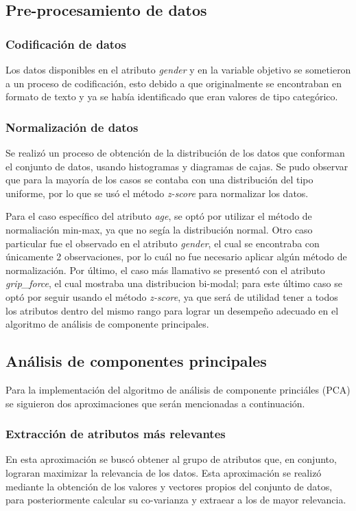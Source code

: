 \subsection{Pre-procesamiento de datos}
\subsubsection{Codificación de datos}
Los datos disponibles en el atributo \emph{gender} y en la variable objetivo se sometieron a un proceso de codificación, esto debido a que originalmente se encontraban en formato de texto y ya se había identificado que eran valores de tipo categórico.

\subsubsection{Normalización de datos}
Se realizó un proceso de obtención de la distribución de los datos que conforman el conjunto de datos, usando histogramas y diagramas de cajas. Se pudo observar que para la mayoría de los casos se contaba con una distribución del tipo uniforme, por lo que se usó el método \emph{z-score} para normalizar los datos.

Para el caso específico del atributo \emph{age}, se optó por utilizar el método de normaliación min-max, ya que no segía la distribución normal. Otro caso particular fue el observado en el atributo \emph{gender}, el cual se encontraba con únicamente 2 observaciones, por lo cuál no fue necesario aplicar algún método de normalización. Por último, el caso más llamativo se presentó con el atributo \emph{grip\_force}, el cual mostraba una distribucion bi-modal; para este último caso se optó por seguir usando el método \emph{z-score}, ya que será de utilidad tener a todos los atributos dentro del mismo rango para lograr un desempeño adecuado en el algoritmo de análisis de componente principales.

\subsection{Análisis de componentes principales}

Para la implementación del algoritmo de análisis de componente princiáles (PCA) se siguieron dos aproximaciones que serán mencionadas a continuación.

\subsubsection{Extracción de atributos más relevantes}
En esta aproximación se buscó obtener al grupo de atributos que, en conjunto, lograran maximizar la relevancia de los datos. Esta aproximación se realizó mediante la obtención de los valores y vectores propios del conjunto de datos, para posteriormente calcular su co-varianza y extraear a los de mayor relevancia.


